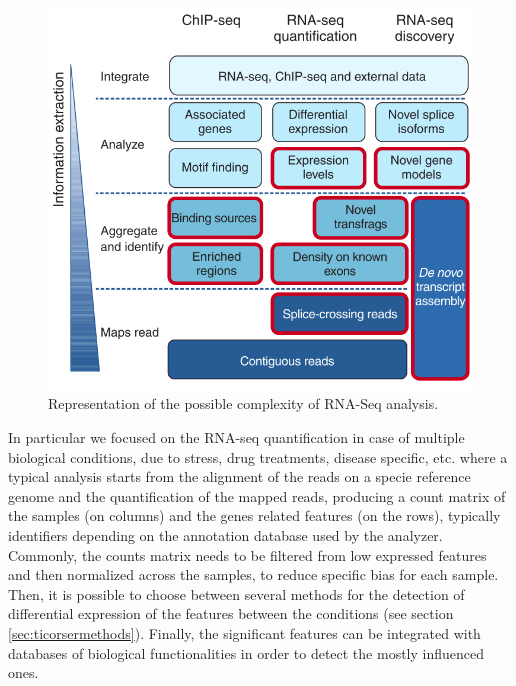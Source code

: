 \begin{figure}[h]
\includegraphics[width=\textwidth,height=\textheight,keepaspectratio]{img/intro/rna-seqan.png}
\caption[RNA-Seq analysis]{Representation of the possible complexity of RNA-Seq analysis. \cite{Pepke2009}}
\label{fig:rnaseqan}
\centering
\end{figure}

In particular we focused on the RNA-seq quantification in case of multiple biological conditions, due to stress, drug treatments, disease specific, etc. where a typical analysis starts from the alignment of the reads on a specie reference genome and the quantification of the mapped reads, producing a count matrix of the samples (on columns) and the genes related features (on the rows), typically identifiers depending on the annotation database used by the analyzer.
Commonly, the counts matrix needs to be filtered from low expressed features and then normalized across the samples, to reduce specific bias for each sample.
Then, it is possible to choose between several methods for the detection of differential expression of the features between the conditions (see section \ref{sec:ticorsermethods}).
Finally, the significant features can be integrated with databases of biological functionalities in order to detect the mostly influenced ones.

